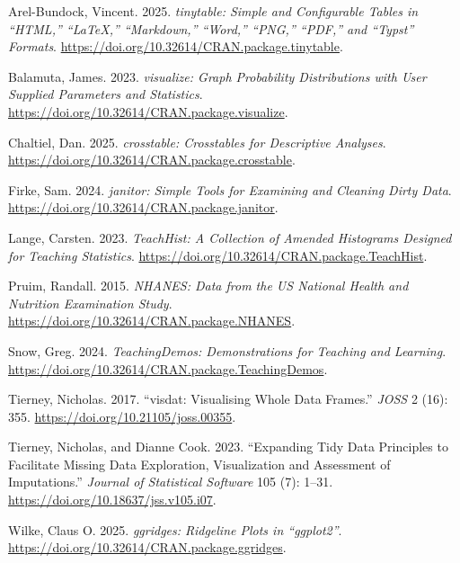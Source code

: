 \documentclass[
  letterpaper,
  DIV=11,
  numbers=noendperiod,
  oneside]{scrartcl}
\newlength{\cslhangindent}
\newenvironment{CSLReferences}[2] %
 {\begin{list}{}{%
  \setlength{\itemindent}{0pt}
  \setlength{\leftmargin}{0pt}
  \setlength{\parsep}{0pt}
  \ifodd #1
   \setlength{\leftmargin}{\cslhangindent}
   \setlength{\itemindent}{-1\cslhangindent}
  \fi
  \setlength{\itemsep}{#2\baselineskip}}}
 {\end{list}}
\begin{document}
\label{refs}
\begin{CSLReferences}{1}{0}
Arel-Bundock, Vincent. 2025. \emph{{tinytable}: Simple and Configurable
Tables in {``{HTML},''} {``{LaTeX},''} {``{Markdown},''} {``{Word},''}
{``{PNG},''} {``{PDF},''} and {``{Typst}''} Formats}.
\url{https://doi.org/10.32614/CRAN.package.tinytable}.

Balamuta, James. 2023. \emph{{visualize}: Graph Probability
Distributions with User Supplied Parameters and Statistics}.
\url{https://doi.org/10.32614/CRAN.package.visualize}.

Chaltiel, Dan. 2025. \emph{{crosstable}: Crosstables for Descriptive
Analyses}. \url{https://doi.org/10.32614/CRAN.package.crosstable}.

Firke, Sam. 2024. \emph{{janitor}: Simple Tools for Examining and
Cleaning Dirty Data}.
\url{https://doi.org/10.32614/CRAN.package.janitor}.

Lange, Carsten. 2023. \emph{{TeachHist}: A Collection of Amended
Histograms Designed for Teaching Statistics}.
\url{https://doi.org/10.32614/CRAN.package.TeachHist}.

Pruim, Randall. 2015. \emph{{NHANES}: Data from the US National Health
and Nutrition Examination Study}.
\url{https://doi.org/10.32614/CRAN.package.NHANES}.

Snow, Greg. 2024. \emph{{TeachingDemos}: Demonstrations for Teaching and
Learning}. \url{https://doi.org/10.32614/CRAN.package.TeachingDemos}.

Tierney, Nicholas. 2017. {``{visdat}: Visualising Whole Data Frames.''}
\emph{JOSS} 2 (16): 355. \url{https://doi.org/10.21105/joss.00355}.

Tierney, Nicholas, and Dianne Cook. 2023. {``Expanding Tidy Data
Principles to Facilitate Missing Data Exploration, Visualization and
Assessment of Imputations.''} \emph{Journal of Statistical Software} 105
(7): 1--31. \url{https://doi.org/10.18637/jss.v105.i07}.

Wilke, Claus O. 2025. \emph{{ggridges}: Ridgeline Plots in
{``{ggplot2}''}}. \url{https://doi.org/10.32614/CRAN.package.ggridges}.

\end{CSLReferences}
\end{document}
